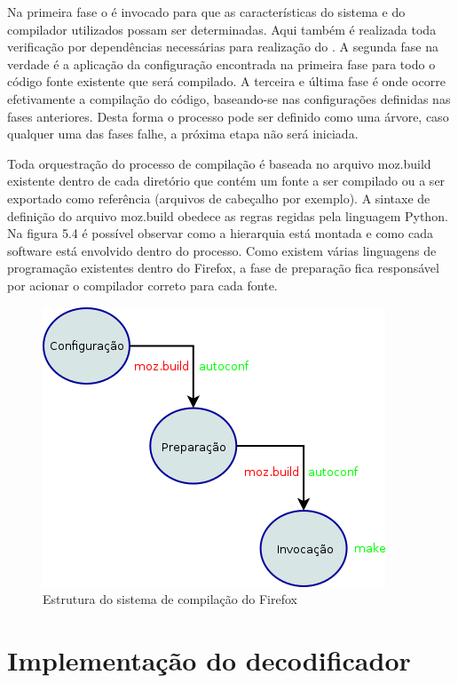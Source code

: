 \documentclass[espaco=simples,appendix=Name]{abnt}
\begin{document}
Na primeira fase o  é invocado para que as características do sistema e do compilador utilizados possam ser determinadas. Aqui também é realizada toda verificação por dependências necessárias para realização do . A segunda fase na verdade é a aplicação da configuração encontrada na primeira fase para todo o código fonte existente que será compilado. A terceira e última fase é onde ocorre efetivamente a compilação do código, baseando-se nas configurações definidas nas fases anteriores. Desta forma o processo pode ser definido como uma árvore, caso qualquer uma das fases falhe, a próxima etapa não será iniciada.

Toda orquestração do processo de compilação é baseada no arquivo moz.build existente dentro de cada diretório que contém um fonte a ser compilado ou a ser exportado como referência (arquivos de cabeçalho por exemplo). A sintaxe de definição do arquivo moz.build obedece as regras regidas pela linguagem Python. Na figura 5.4 é possível observar como a hierarquia está montada e como cada software está envolvido dentro do processo. Como existem várias linguagens de programação existentes dentro do Firefox, a fase de preparação fica responsável por acionar o compilador correto para cada fonte.

\begin{figure}[h]
  \centering
    \includegraphics[scale=0.45]{BuildSystem.png}
  \caption{Estrutura do sistema de compilação do Firefox}
\end{figure}

\section{Implementação do decodificador}
\end{document}
